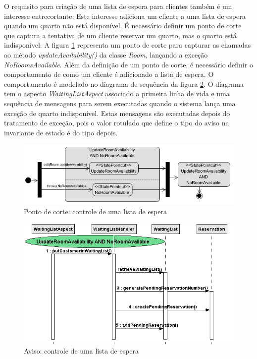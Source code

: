 O requisito para criação de uma lista de espera para clientes também é um interesse entrecortante. Este interesse adiciona um cliente a uma lista de
espera quando um quarto não está disponível. É necessário definir um ponto de corte que captura a tentativa de um cliente reservar um
quarto, mas o quarto está indisponível. A figura \ref{fig:case_study_behavioral_pointcut_waiting_list} representa um ponto de corte
para capturar as chamadas ao método \textit{updateAvailability()} da classe \textit{Room}, lançando a exceção \textit{NoRoomsAvailable}. Além da
definição de um ponto de corte, é necessário definir o comportamento de como um cliente é adicionado a lista de espera. O comportamento é modelado no
diagrama de sequência da figura \ref{fig:case_study_behavioral_waiting_list}. O diagrama tem o aspecto \textit{WaitingListAspect} associado a primeira 
linha de vida e uma sequência de mensagens para serem executadas quando o sistema lança uma exceção de quarto indisponível. Estas
mensagens são executadas depois do tratamento de exceção, pois o valor rotulado que define o tipo do aviso na invariante de estado é do tipo depois.

  \begin{figure}[tb]
	\centering
	\includegraphics[scale=0.6]{img/case_study_behavioral_pointcut_waiting_list.png}
	\caption{Ponto de corte: controle de uma lista de espera}\label{fig:case_study_behavioral_pointcut_waiting_list}
  \end{figure}
 
 \begin{landscape}
  \begin{figure}[!h]
	\centering
	\includegraphics{img/case_study_behavioral_waiting_list.png}
	\caption{Aviso: controle de uma lista de espera}\label{fig:case_study_behavioral_waiting_list}
  \end{figure}
 \end{landscape}

